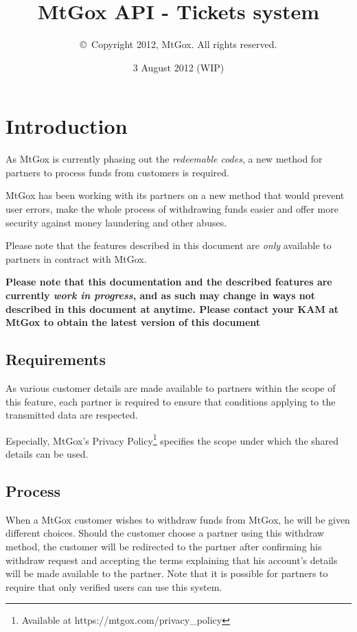 \documentclass[a4paper,12pt]{article}
\title{MtGox API - Tickets system}
\author{\copyright~Copyright 2012, MtGox. All rights reserved.}
\date{3 August 2012 (WIP)}
\begin{document}
\maketitle

\tableofcontents

\section{Introduction}

As MtGox is currently phasing out the \emph{redeemable codes}, a new method
for partners to process funds from customers is required.

MtGox has been working with its partners on a new method that would prevent
user errors, make the whole process of withdrawing funds easier and offer more
security against money laundering and other abuses.

Please note that the features described in this document are \emph{only}
available to partners in contract with MtGox.

\textbf{Please note that this documentation and the described features are
currently \emph{work in progress}, and as such may change in ways not
described in this document at anytime. Please contact your KAM at MtGox to
obtain the latest version of this document}

\subsection{Requirements}

As various customer details are made available to partners within the scope
of this feature, each partner is required to ensure that conditions applying
to the transmitted data are respected.

Especially, MtGox's Privacy Policy\footnote{Available at
https://mtgox.com/privacy\_policy} specifies the scope under which the shared
details can be used.

\subsection{Process}

When a MtGox customer wishes to withdraw funds from MtGox, he will be given
different choices. Should the customer choose a partner using this withdraw
method, the customer will be redirected to the partner after confirming his
withdraw request and accepting the terms explaining that his account's details
will be made available to the partner. Note that it is possible for partners
to require that only verified users can use this system.
\end{document}
